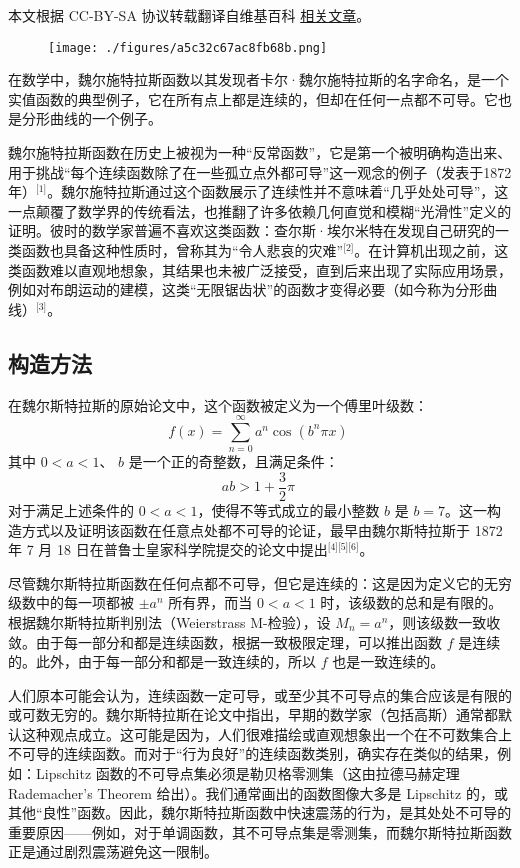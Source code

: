 
本文根据 CC-BY-SA 协议转载翻译自维基百科 \href{https://en.wikipedia.org/wiki/Weierstrass_function}{相关文章}。

\begin{figure}[ht]
\centering
\texttt{[image: ./figures/a5c32c67ac8fb68b.png]}
\caption{} \label{fig_WRST_1}
\end{figure}
在数学中，魏尔施特拉斯函数以其发现者卡尔·魏尔施特拉斯的名字命名，是一个实值函数的典型例子，它在所有点上都是连续的，但却在任何一点都不可导。它也是分形曲线的一个例子。

魏尔施特拉斯函数在历史上被视为一种“反常函数”，它是第一个被明确构造出来、用于挑战“每个连续函数除了在一些孤立点外都可导”这一观念的例子（发表于1872年）\(^\text{[1]}\)。魏尔施特拉斯通过这个函数展示了连续性并不意味着“几乎处处可导”，这一点颠覆了数学界的传统看法，也推翻了许多依赖几何直觉和模糊“光滑性”定义的证明。彼时的数学家普遍不喜欢这类函数：查尔斯·埃尔米特在发现自己研究的一类函数也具备这种性质时，曾称其为“令人悲哀的灾难”\(^\text{[2]}\)。在计算机出现之前，这类函数难以直观地想象，其结果也未被广泛接受，直到后来出现了实际应用场景，例如对布朗运动的建模，这类“无限锯齿状”的函数才变得必要（如今称为分形曲线）\(^\text{[3]}\)。
\subsection{构造方法}
在魏尔斯特拉斯的原始论文中，这个函数被定义为一个傅里叶级数：
$$
f(x) = \sum_{n=0}^{\infty} a^n \cos(b^n \pi x)~
$$
其中
$0 < a < 1$、
$b$ 是一个正的奇整数，且满足条件：
$$
ab > 1 + \frac{3}{2}\pi~
$$
对于满足上述条件的 $0 < a < 1$，使得不等式成立的最小整数 $b$ 是 $b = 7$。这一构造方式以及证明该函数在任意点处都不可导的论证，最早由魏尔斯特拉斯于 1872 年 7 月 18 日在普鲁士皇家科学院提交的论文中提出\(^\text{[4][5][6]}\)。

尽管魏尔斯特拉斯函数在任何点都不可导，但它是连续的：这是因为定义它的无穷级数中的每一项都被 $\pm a^n$ 所有界，而当 $0 < a < 1$ 时，该级数的总和是有限的。根据魏尔斯特拉斯判别法（Weierstrass M-检验），设 $M_n = a^n$，则该级数一致收敛。由于每一部分和都是连续函数，根据一致极限定理，可以推出函数 $f$ 是连续的。此外，由于每一部分和都是一致连续的，所以 $f$ 也是一致连续的。

人们原本可能会认为，连续函数一定可导，或至少其不可导点的集合应该是有限的或可数无穷的。魏尔斯特拉斯在论文中指出，早期的数学家（包括高斯）通常都默认这种观点成立。这可能是因为，人们很难描绘或直观想象出一个在不可数集合上不可导的连续函数。而对于“行为良好”的连续函数类别，确实存在类似的结果，例如：Lipschitz 函数的不可导点集必须是勒贝格零测集（这由拉德马赫定理 Rademacher's Theorem 给出）。我们通常画出的函数图像大多是 Lipschitz 的，或其他“良性”函数。因此，魏尔斯特拉斯函数中快速震荡的行为，是其处处不可导的重要原因——例如，对于单调函数，其不可导点集是零测集，而魏尔斯特拉斯函数正是通过剧烈震荡避免这一限制。

